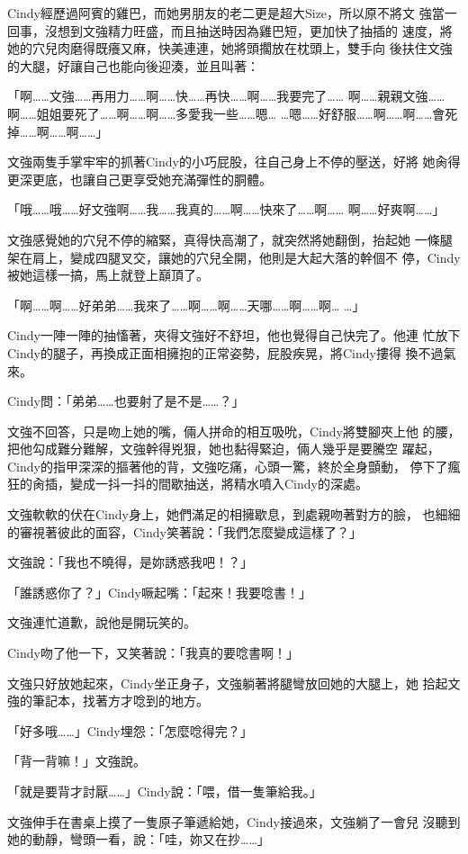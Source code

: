 Cindy經歷過阿賓的雞巴，而她男朋友的老二更是超大Size，所以原不將文
強當一回事，沒想到文強精力旺盛，而且抽送時因為雞巴短，更加快了抽插的
速度，將她的穴兒肉磨得既癢又麻，快美連連，她將頭擱放在枕頭上，雙手向
後扶住文強的大腿，好讓自己也能向後迎湊，並且叫著：

「啊……文強……再用力……啊……快……再快……啊……我要完了……
啊……親親文強……啊……姐姐要死了……啊……啊……多愛我一些……嗯…
…嗯……好舒服……啊……啊……會死掉……啊……啊……」

文強兩隻手掌牢牢的抓著Cindy的小巧屁股，往自己身上不停的壓送，好將
她肏得更深更底，也讓自己更享受她充滿彈性的胴體。

「哦……哦……好文強啊……我……我真的……啊……快來了……啊……
啊……好爽啊……」

文強感覺她的穴兒不停的縮緊，真得快高潮了，就突然將她翻倒，抬起她
一條腿架在肩上，變成四腿叉交，讓她的穴兒全開，他則是大起大落的幹個不
停，Cindy被她這樣一搞，馬上就登上巔頂了。

「啊……啊……好弟弟……我來了……啊……啊……天哪……啊……啊…
…」

Cindy一陣一陣的抽慉著，夾得文強好不舒坦，他也覺得自己快完了。他連
忙放下Cindy的腿子，再換成正面相擁抱的正常姿勢，屁股疾晃，將Cindy摟得
換不過氣來。

Cindy問：「弟弟……也要射了是不是……？」

文強不回答，只是吻上她的嘴，倆人拼命的相互吸吮，Cindy將雙腳夾上他
的腰，把他勾成難分難解，文強幹得兇狠，她也黏得緊迫，倆人幾乎是要騰空
躍起，Cindy的指甲深深的摳著他的背，文強吃痛，心頭一驚，終於全身顫動，
停下了瘋狂的肏插，變成一抖一抖的間歇抽送，將精水噴入Cindy的深處。

文強軟軟的伏在Cindy身上，她們滿足的相擁歇息，到處親吻著對方的臉，
也細細的審視著彼此的面容，Cindy笑著說：「我們怎麼變成這樣了？」

文強說：「我也不曉得，是妳誘惑我吧！？」

「誰誘惑你了？」Cindy噘起嘴：「起來！我要唸書！」

文強連忙道歉，說他是開玩笑的。

Cindy吻了他一下，又笑著說：「我真的要唸書啊！」

文強只好放她起來，Cindy坐正身子，文強躺著將腿彎放回她的大腿上，她
拾起文強的筆記本，找著方才唸到的地方。

「好多哦……」Cindy埋怨：「怎麼唸得完？」

「背一背嘛！」文強說。

「就是要背才討厭……」Cindy說：「喂，借一隻筆給我。」

文強伸手在書桌上摸了一隻原子筆遞給她，Cindy接過來，文強躺了一會兒
沒聽到她的動靜，彎頭一看，說：「哇，妳又在抄……」

